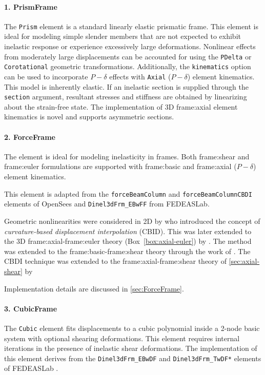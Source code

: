 \paragraph{1. PrismFrame}
The \texttt{Prism} element is a standard linearly elastic prismatic
  frame. This element is ideal for modeling simple slender members that
  are not expected to exhibit inelastic response or experience
  excessively large deformations. 
  Nonlinear effects from moderately
  large displacements can be accounted for using the \texttt{PDelta} or
  \texttt{Corotational} geometric transformations. Additionally, the
  \texttt{kinematics} option can be used to incorporate \(P-\delta\)
  effects with \texttt{Axial}  (\(P-\delta\)) element kinematics. 
  This model is inherently elastic. 
  If an inelastic section is supplied through the \texttt{section} argument,
  resultant stresses and stiffness are obtained by linearizing about the
  strain-free state. 
  The implementation of 3D \gls{frame:axial} element
  kinematics is novel and supports asymmetric sections.


\paragraph{2. ForceFrame}
  The \ForceFrame{} element is ideal for modeling inelasticity in
  frames. 
  Both \gls{frame:shear} and \gls{frame:euler} formulations are
  supported with \gls{frame:basic} and \gls{frame:axial} (\(P-\delta\)) element kinematics. 
  
  This element is adapted from the \texttt{forceBeamColumn} and
  \texttt{forceBeamColumnCBDI} elements of OpenSees and
  \texttt{Dinel3dFrm\_EBwFF} from FEDEASLab. 
  
%
  Geometric nonlinearities were considered in 2D by \textcite{neuenhofer1997evaluation} who introduced the concept of \emph{curvature-based displacement interpolation} (CBID). 
  This was later extended to the 3D \gls{frame:axial}-\gls{frame:euler} theory (Box~\ref{box:axial-euler}) by \cite{desouza2000forcebased}.
%
  The method was extended to the \gls{frame:basic}-\gls{frame:shear} theory through the work of \cite{taylor2003mixed,saritas2004modeling,saritas2009frame}.
%
  The CBDI technique was extended to the \gls{frame:axial}-\gls{frame:shear} theory of \cref{sec:axial-shear}  by \cite{jar}

  Implementation details are discussed in \cref{sec:ForceFrame}.


\paragraph{3. CubicFrame}
  The \texttt{Cubic} element fits displacements to a cubic polynomial
  inside a 2-node basic system with optional shearing deformations. This
  element requires internal iterations in the presence of inelastic
  shear deformations. 
  The implementation of this element derives from
  the \texttt{Dinel3dFrm\_EBwDF} and \texttt{Dinel3dFrm\_TwDF*} elements
  of FEDEASLab \citep{filippou1996fedeas}.


